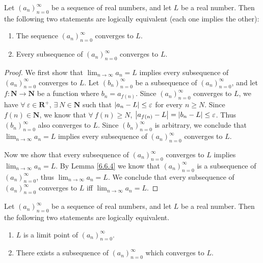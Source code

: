 \begin{proposition}\label{6.6.5}
    Let \((a_n)_{n = 0}^\infty\) be a sequence of real numbers, and let \(L\) be a real number.
    Then the following two statements are logically equivalent (each one implies the other):
    \begin{enumerate}
        \item The sequence \((a_n)_{n = 0}^\infty\) converges to \(L\).
        \item Every subsequence of \((a_n)_{n = 0}^\infty\) converges to \(L\).
    \end{enumerate}
\end{proposition}

\begin{proof}
    We first show that \(\lim_{n \to \infty} a_n = L\) implies every subsequence of \((a_n)_{n = 0}^\infty\) converges to \(L\).
    Let \((b_n)_{n = 0}^\infty\) be a subsequence of \((a_n)_{n = 0}^\infty\), and let \(f : \mathbf{N} \to \mathbf{N}\) be a function where \(b_n = a_{f(n)}\).
    Since \((a_n)_{n = 0}^\infty\) converges to \(L\), we have \(\forall\ \varepsilon \in \mathbf{R}^+\), \(\exists\ N \in \mathbf{N}\) such that \(\abs*{a_n - L} \leq \varepsilon\) for every \(n \geq N\).
    Since \(f(n) \in \mathbf{N}\), we know that \(\forall\ f(n) \geq N\), \(\abs*{a_{f(n)} - L} = \abs*{b_n - L} \leq \varepsilon\).
    Thus \((b_n)_{n = 0}^\infty\) also converges to \(L\).
    Since \((b_n)_{n = 0}^\infty\) is arbitrary, we conclude that \(\lim_{n \to \infty} a_n = L\) implies every subsequence of \((a_n)_{n = 0}^\infty\) converges to \(L\).

    Now we show that every subsequence of \((a_n)_{n = 0}^\infty\) converges to \(L\) implies \(\lim_{n \to \infty} a_n = L\).
    By Lemma \ref{6.6.4} we know that \((a_n)_{n = 0}^\infty\) is a subsequence of \((a_n)_{n = 0}^\infty\), thus \(\lim_{n \to \infty} a_n = L\).
    We conclude that every subsequence of \((a_n)_{n = 0}^\infty\) converges to \(L\) iff \(\lim_{n \to \infty} a_n = L\).
\end{proof}

\begin{proposition}\label{6.6.6}
    Let \((a_n)_{n = 0}^\infty\) be a sequence of real numbers, and let \(L\) be a real number.
    Then the following two statements are logically equivalent.
    \begin{enumerate}
        \item \(L\) is a limit point of \((a_n)_{n = 0}^\infty\).
        \item There exists a subsequence of \((a_n)_{n = 0}^\infty\) which converges to \(L\).
    \end{enumerate}
\end{proposition}

